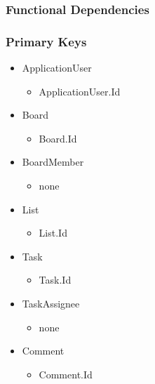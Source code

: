 \documentclass[letterpaper]{article}
\begin{document}
\subsubsection{Functional Dependencies}

\subsubsection{Primary Keys}
\begin{itemize}
  \item ApplicationUser
    \begin{itemize}
      \item ApplicationUser.Id
    \end{itemize}
  \item Board
    \begin{itemize}
      \item Board.Id
    \end{itemize}
  \item BoardMember
    \begin{itemize}
      \item none
    \end{itemize}
  \item List
    \begin{itemize}
      \item List.Id
    \end{itemize}
  \item Task
    \begin{itemize}
      \item Task.Id
    \end{itemize}
  \item TaskAssignee
    \begin{itemize}
      \item none
    \end{itemize}
  \item Comment
    \begin{itemize}
      \item Comment.Id
    \end{itemize}
\end{itemize}
\end{document}
